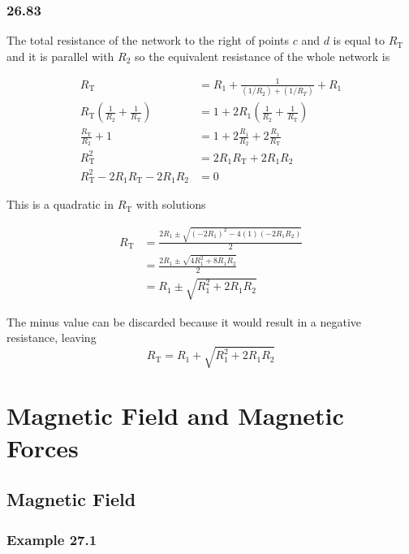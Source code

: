 \documentclass{article}
\begin{document}
\subsubsection{26.83}

The total resistance of the network to the right of points $c$ and $d$ is equal to $R_\textrm{T}$ and it is parallel with $R_2$ so the equivalent resistance of the whole network is

\begin{align*}
  R_\textrm{T}                                                       & = R_1 + \frac{1}{(1 / R_2) + (1 / R_T)} + R_1                     \\
  R_\textrm{T} \left( \frac{1}{R_2} + \frac{1}{R_\textrm{T}} \right) & = 1 + 2 R_1 \left( \frac{1}{R_2} + \frac{1}{R_\textrm{T}} \right) \\
  \frac{R_\textrm{T}}{R_2} + 1                                       & = 1 + 2 \frac{R_1}{R_2} + 2 \frac{R_1}{R_\textrm{T}}              \\
  R_\textrm{T}^2                                                     & = 2 R_1 R_\textrm{T} + 2 R_1 R_2                                  \\
  R_\textrm{T}^2 - 2 R_1 R_\textrm{T} - 2 R_1 R_2                    & = 0
\end{align*}

This is a quadratic in $R_\textrm{T}$ with solutions

\begin{align*}
  R_\textrm{T} & = \frac{2 R_1 \pm \sqrt{(-2 R_1)^2 - 4 (1) (-2 R_1 R_2)}}{2} \\
               & = \frac{2 R_1 \pm \sqrt{4 R_1^2 + 8 R_1 R_2}}{2}             \\
               & = R_1 \pm \sqrt{R_1^2 + 2 R_1 R_2}
\end{align*}

The minus value can be discarded because it would result in a negative resistance, leaving \[R_\textrm{T} = R_1 + \sqrt{R_1^2 + 2 R_1 R_2}\]

\section{Magnetic Field and Magnetic Forces}

\subsection{Magnetic Field}

\subsubsection{Example 27.1}
\end{document}
